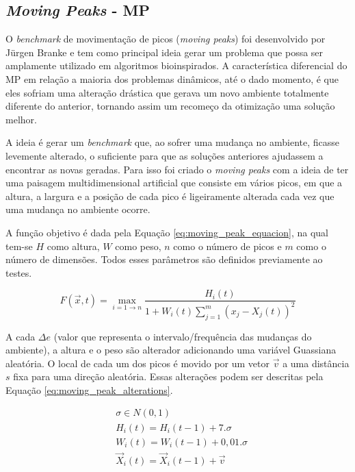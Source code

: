 \subsection{\textit{Moving Peaks} - MP}
\label{sec:moving_peaks}

O \textit{benchmark} de movimentação de picos (\textit{moving peaks}) foi desenvolvido por Jürgen Branke \cite{moving_peak_1999} e tem como principal ideia gerar um problema que possa ser amplamente utilizado em algoritmos bioinspirados. A característica diferencial do MP em relação a maioria dos problemas dinâmicos, até o dado momento, é que eles sofriam uma alteração drástica que gerava um novo ambiente totalmente diferente do anterior, tornando assim um recomeço da otimização uma solução melhor.

A ideia é gerar um \textit{benchmark} que, ao sofrer uma mudança no ambiente, ficasse levemente alterado, o suficiente para que as soluções anteriores ajudassem a encontrar as novas geradas. Para isso foi criado o \textit{moving peaks} com a ideia de ter uma paisagem multidimensional artificial que consiste em vários picos, em que a altura, a largura e a posição de cada pico é ligeiramente alterada cada vez que uma mudança no ambiente ocorre.

A função objetivo é dada pela Equação \ref{eq:moving_peak_equacion}, na qual tem-se $ H $ como altura, $ W $ como peso, $ n $ como o número de picos e $ m $ como o número de dimensões. Todos esses parâmetros são definidos previamente ao testes.

\begin{equation}
\label{eq:moving_peak_equacion}
F(\vec{x},t) = \max_{i = 1 \to n} \frac {H_i(t)}{1 + W_i(t)\sum_{j=1}^{m} (x_j - X_j(t))^2}
\end{equation}

A cada $\Delta e$ (valor que representa o intervalo/frequência das mudanças do ambiente), a altura e o peso são alterador adicionando uma variável Guassiana aleatória. O local de cada um dos picos é movido por um vetor $\vec{v}$ a uma distância $ s $ fixa para uma direção aleatória. Essas alterações podem ser descritas pela Equação \ref{eq:moving_peak_alterations}.

\begin{equation}
\label{eq:moving_peak_alterations}
\begin{split}
& \sigma \in N(0,1) \\
& H_i(t) = H_i(t-1) + 7.\sigma \\
& W_i(t) = W_i(t-1) + 0,01.\sigma \\
& \vec{X}_i(t) = \vec{X}_i(t-1) + \vec{v}
\end{split}
\end{equation}

